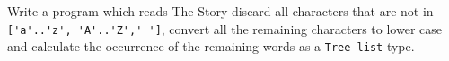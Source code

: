 Write a program which reads The Story discard all characters that are not in \lstinline{['a'..'z', 'A'..'Z',' ']}, convert all the remaining characters to lower case and calculate the occurrence of the remaining words as a \lstinline{Tree list} type.
